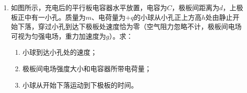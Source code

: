 \begin{enumerate}[leftmargin=0em]
\begin{figure}[h!]
\flushright

\end{figure}



\item
{}
如图所示，充电后的平行板电容器水平放置，电容为$ C $，极板间距离为$ d $，上极板正中有一小孔。质量为$ m $、电荷量为$ +q $的小球从小孔正上方高$ h $处由静止开始下落，穿过小孔到达下极板处速度恰为零（空气阻力忽略不计，极板间电场可视为匀强电场，重力加速度为$ g $）。求：

\begin{minipage}[h!]{0.7\linewidth}
\vspace{0.3em}
\begin{enumerate}
\renewcommand{\labelenumi}{\arabic{enumi}.}
\item
小球到达小孔处的速度；
\item 极板间电场强度大小和电容器所带电荷量；
\item 小球从开始下落运动到下极板的时间。



\end{enumerate}
\vspace{0.3em}
\end{minipage}
\hfill
\begin{minipage}[h!]{0.3\linewidth}
\flushright
\vspace{0.3em}

\vspace{0.3em}
\end{minipage}

\vspace{0.7cm}

\end{enumerate}
